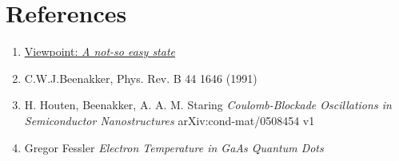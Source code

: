 \documentclass[a4paper]{report}
\begin{document}
  \section*{References}
    \begin{enumerate}\label{ref}
      \item   \href{http://physics.aps.org/articles/v3/47}{Viewpoint: \emph{A not-so easy state}}\label{x1}
      \item C.W.J.Beenakker, Phys. Rev. B 44 1646 (1991) \label{ref2}
      \item H. Houten, Beenakker, A. A. M. Staring \textit{Coulomb-Blockade Oscillations in Semiconductor Nanostructures}  arXiv:cond-mat/0508454 v1 \label{ref3}
      \item Gregor Fessler \textit{Electron Temperature in GaAs Quantum Dots} \label{ref4}
    \end{enumerate}
\end{document}
